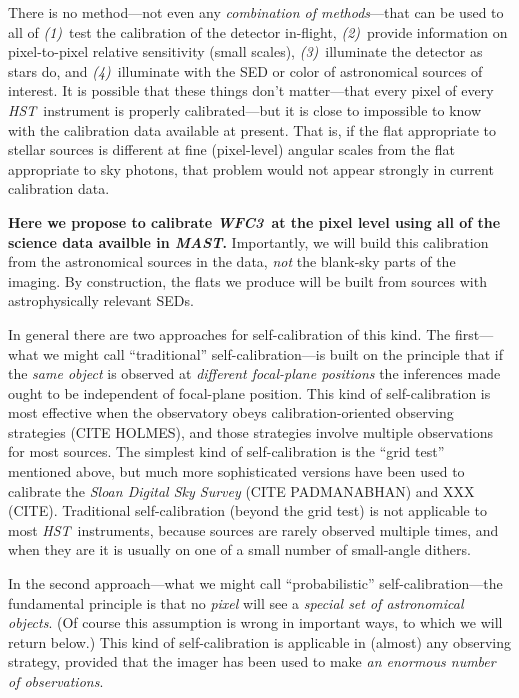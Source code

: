 \documentclass[12pt]{article}
\newcommand{\project}[1]{\textsl{#1}}
\newcommand{\HST}{\project{HST}}
\newcommand{\WFC}{\project{WFC3}}
\newcommand{\MAST}{\project{MAST}}
\begin{document}
There is no method---not even any \emph{combination of methods}---that
can be used to all of \textsl{(1)}~test the calibration of the
detector in-flight, \textsl{(2)}~provide information on pixel-to-pixel
relative sensitivity (small scales), \textsl{(3)}~illuminate the
detector as stars do, and \textsl{(4)}~illuminate with the SED or
color of astronomical sources of interest.  It is possible that these
things don't matter---that every pixel of every \HST\ instrument is
properly calibrated---but it is close to impossible to know with the
calibration data available at present.  That is, if the flat
appropriate to stellar sources is different at fine (pixel-level)
angular scales from the flat appropriate to sky photons, that problem
would not appear strongly in current calibration data.

\textbf{Here we propose to calibrate \WFC\ at the pixel
  level using all of the science data availble in \MAST.}
Importantly, we will build this calibration from the astronomical
sources in the data, \emph{not} the blank-sky parts of the imaging.
By construction, the flats we produce will be built from sources with
astrophysically relevant SEDs.

In general there are two approaches for self-calibration of this kind.
The first---what we might call ``traditional'' self-calibration---is
built on the principle that if the \emph{same object} is observed at
\emph{different focal-plane positions} the inferences made ought to be
independent of focal-plane position.  This kind of self-calibration is
most effective when the observatory obeys calibration-oriented
observing strategies (CITE HOLMES), and those strategies involve
multiple observations for most sources.  The simplest kind of
self-calibration is the ``grid test'' mentioned above, but much more
sophisticated versions have been used to calibrate the \project{Sloan
  Digital Sky Survey} (CITE PADMANABHAN) and XXX (CITE).  Traditional
self-calibration (beyond the grid test) is not applicable to most
\HST\ instruments, because sources are rarely observed multiple times,
and when they are it is usually on one of a small number of
small-angle dithers.

In the second approach---what we might call ``probabilistic''
self-calibration---the fundamental principle is that no \emph{pixel}
will see a \emph{special set of astronomical objects}.  (Of course
this assumption is wrong in important ways, to which we will return
below.)  This kind of self-calibration is applicable in (almost) any
observing strategy, provided that the imager has been used to make
\emph{an enormous number of observations}.
\end{document}
